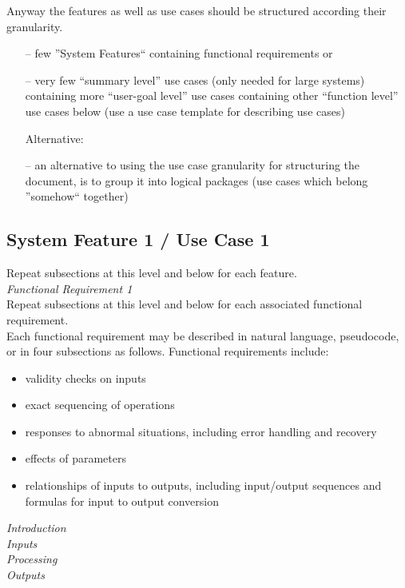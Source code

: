 \noindent Anyway the features as well as use cases should be structured according their granularity.
\begin{itemize}
	\item[--] few ''System Features`` containing functional requirements or
	\item[--] very few “summary level” use cases (only needed for large systems) containing more “user-goal level” use cases containing other “function level” use cases below (use a use case template for describing use cases)
	\item[] Alternative:
	\item[--] an alternative to using the use case granularity for structuring the document, is to group it into logical packages (use cases which belong ''somehow`` together)
\end{itemize}

\subsection{System Feature 1 / Use Case 1}
Repeat subsections at this level and below for each feature. \\[-0.3cm]

\noindent \textit{\large Functional Requirement 1} \\
Repeat subsections at this level and below for each associated functional requirement. \\[-0.3cm]

\noindent Each functional requirement may be described in natural language, pseudocode, or in four subsections as follows. Functional requirements include:
\begin{itemize}
	\item validity checks on inputs
	\item exact sequencing of operations
	\item responses to abnormal situations, including error handling and recovery
	\item effects of parameters
	\item relationships of inputs to outputs, including input/output sequences and formulas for input to output
conversion
\end{itemize}

\noindent \textit{\large Introduction} \\
\textit{\large Inputs} \\
\textit{\large Processing} \\
\textit{\large Outputs} \\

